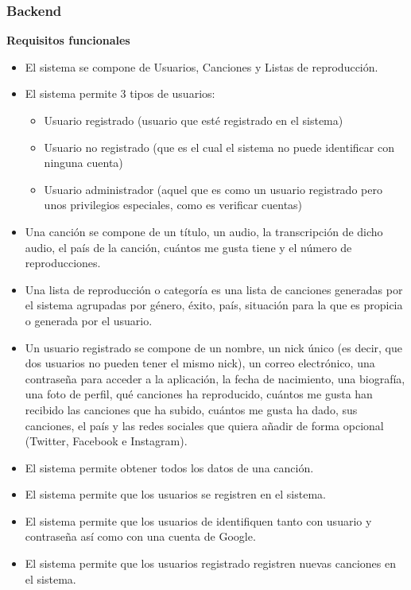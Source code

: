 \documentclass[12pt]{article}%
\begin{document}
\subsubsection{Backend}
\textbf{Requisitos funcionales}
\begin{itemize}

	\item El sistema se compone de Usuarios, Canciones y Listas de reproducci\'on.
	\item El sistema permite 3 tipos de usuarios:
	\begin{itemize}
		\item Usuario registrado (usuario que esté registrado en el sistema)
		\item Usuario no registrado (que es el cual el sistema no puede identificar con ninguna cuenta)
		\item Usuario administrador (aquel que es como un usuario registrado pero unos privilegios especiales, como es verificar cuentas)
	\end{itemize}
	\item Una canci\'on se compone de un t\'itulo, un audio, la transcripci\'on de dicho audio, el pa\'is de la canci\'on, cu\'antos me gusta tiene y el n\'umero de reproducciones.
	\item Una lista de reproducci\'on o categor\'ia es una lista de canciones generadas por el sistema agrupadas por g\'enero, \'exito, pa\'is, situaci\'on para la que es propicia o generada por el usuario.
	\item Un usuario registrado se compone de un nombre, un nick \'unico (es decir, que dos usuarios no pueden tener el mismo nick), un correo electr\'onico, una contrase\~na para acceder a la aplicaci\'on, la fecha de nacimiento, una biograf\'ia, una foto de perfil, qu\'e canciones ha reproducido, cu\'antos me gusta han recibido las canciones que ha subido, cu\'antos me gusta ha dado, sus canciones, el pa\'is y las redes sociales que quiera a\~nadir de forma opcional (Twitter, Facebook e Instagram).
	
	\item El sistema permite obtener todos los datos de una canci\'on.
	
	
	\item El sistema permite que los usuarios se registren en el sistema.
	\item El sistema permite que los usuarios de identifiquen tanto con usuario y contraseña así como con una cuenta de Google.
	\item El sistema permite que los usuarios registrado registren nuevas canciones en el sistema.
	

\end{itemize}
\end{document}
